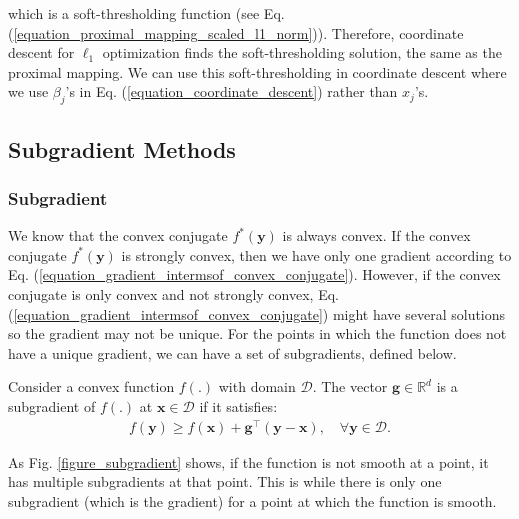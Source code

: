 \documentclass[lang=cn,10pt]{gorgeousnbook}
\numberwithin{equation}{section}%
\numberwithin{figure}{section}%
\begin{document}
which is a soft-thresholding function (see Eq. (\ref{equation_proximal_mapping_scaled_l1_norm})). Therefore, coordinate descent for $\ell_1$ optimization finds the soft-thresholding solution, the same as the proximal mapping. 
We can use this soft-thresholding in coordinate descent where we use $\beta_j$'s in Eq. (\ref{equation_coordinate_descent}) rather than $x_j$'s.

\subsection{Subgradient Methods}



\subsubsection{Subgradient}\label{section_subgradient}

We know that the convex conjugate $f^*(\boldsymbol{y})$ is always convex. 
If the convex conjugate $f^*(\boldsymbol{y})$ is strongly convex, then we have only one gradient according to Eq. (\ref{equation_gradient_intermsof_convex_conjugate}). However, if the convex conjugate is only convex and not strongly convex, Eq. (\ref{equation_gradient_intermsof_convex_conjugate}) might have several solutions so the gradient may not be unique. For the points in which the function does not have a unique gradient, we can have a set of subgradients, defined below. 

\begin{definition}[Subgradient]
Consider a convex function $f(.)$ with domain $\mathcal{D}$.
The vector $\boldsymbol{g} \in \mathbb{R}^d$ is a subgradient of $f(.)$ at $\boldsymbol{x} \in \mathcal{D}$ if it satisfies:
\begin{align}\label{equation_subgradient}
f(\boldsymbol{y}) \geq f(\boldsymbol{x}) + \boldsymbol{g}^\top (\boldsymbol{y} - \boldsymbol{x}), \quad \forall \boldsymbol{y} \in \mathcal{D}.
\end{align}
\end{definition}
As Fig. \ref{figure_subgradient} shows, if the function is not smooth at a point, it has multiple subgradients at that point. This is while there is only one subgradient (which is the gradient) for a point at which the function is smooth. 
\end{document}
